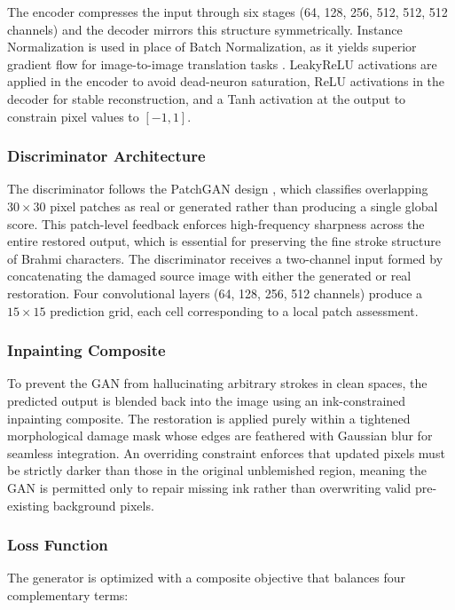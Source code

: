 \documentclass[conference]{IEEEtran}
\begin{document}
The encoder compresses the input through six stages (64, 128, 256, 512, 512, 512 channels) and the decoder mirrors this structure symmetrically. Instance Normalization is used in place of Batch Normalization, as it yields superior gradient flow for image-to-image translation tasks \cite{mandal2020restoration}. LeakyReLU activations are applied in the encoder to avoid dead-neuron saturation, ReLU activations in the decoder for stable reconstruction, and a Tanh activation at the output to constrain pixel values to $[-1, 1]$.

\subsubsection{Discriminator Architecture}

The discriminator follows the PatchGAN design \cite{mandal2020restoration}, which classifies overlapping $30\times30$ pixel patches as real or generated rather than producing a single global score. This patch-level feedback enforces high-frequency sharpness across the entire restored output, which is essential for preserving the fine stroke structure of Brahmi characters. The discriminator receives a two-channel input formed by concatenating the damaged source image with either the generated or real restoration. Four convolutional layers (64, 128, 256, 512 channels) produce a $15\times15$ prediction grid, each cell corresponding to a local patch assessment.

\subsubsection{Inpainting Composite}

To prevent the GAN from hallucinating arbitrary strokes in clean spaces, the predicted output is blended back into the image using an ink-constrained inpainting composite. The restoration is applied purely within a tightened morphological damage mask whose edges are feathered with Gaussian blur for seamless integration. An overriding constraint enforces that updated pixels must be strictly darker than those in the original unblemished region, meaning the GAN is permitted only to repair missing ink rather than overwriting valid pre-existing background pixels.

\subsubsection{Loss Function}

The generator is optimized with a composite objective that balances four complementary terms:
\end{document}

